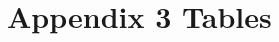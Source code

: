 \documentclass[a4paper,12pt]{article}
\begin{document}

\makeatletter 
\renewcommand{\thesection}{\hspace*{-1.0em}}
\newpage
\linespread{1}



\newpage


\setcounter{table}{0} 
\makeatletter 
\renewcommand{\thetable}{A\@arabic \c@table} 
\FloatBarrier



\section{Appendix 3 Tables}
\end{document}
